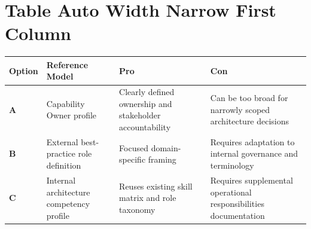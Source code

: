 \section{Table Auto Width Narrow First
Column}\label{table-auto-width-narrow-first-column}

{\def\LTcaptype{none} %
\begin{longtable}[]{@{}
  >{\raggedright\arraybackslash}p{}
  >{\raggedright\arraybackslash}p{}
  >{\raggedright\arraybackslash}p{}
  >{\raggedright\arraybackslash}p{}@{}}
\toprule\noalign{}
\begin{minipage}[b]{\linewidth}\raggedright
Option
\end{minipage} & \begin{minipage}[b]{\linewidth}\raggedright
Reference Model
\end{minipage} & \begin{minipage}[b]{\linewidth}\raggedright
Pro
\end{minipage} & \begin{minipage}[b]{\linewidth}\raggedright
Con
\end{minipage} \\
\midrule\noalign{}
\endhead
\bottomrule\noalign{}
\endlastfoot
\textbf{A} & Capability Owner profile & Clearly defined ownership and
stakeholder accountability & Can be too broad for narrowly scoped
architecture decisions \\
\textbf{B} & External best-practice role definition & Focused
domain-specific framing & Requires adaptation to internal governance and
terminology \\
\textbf{C} & Internal architecture competency profile & Reuses existing
skill matrix and role taxonomy & Requires supplemental operational
responsibilities documentation \\
\end{longtable}
}
